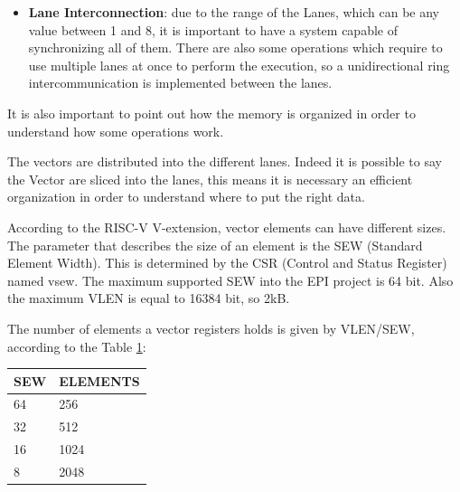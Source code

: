 \begin{itemize}
    This solution implies the existence of some cost in terms of latency, due to the starting of a new instruction.
    Inside the Vector Lane are also important the WB (Write-Back Buffer) and the LB (Load Buffer). Those buffers store the data until the VRF line is complete.
    Then there is the SB (Store Buffer) which hold the data read from the  register file and then sends it to the MU. 
    Eventually when an instruction is completed the physical register are then freed. 
    
    The VPU can be configured with different numbers of lanes from 1 up to 8, the default value is 8.
    
    \item \textbf{Lane Interconnection}: due to the range of the Lanes, which can be any value between 1 and 8, it is important to have a system capable of synchronizing all of them. There are also some operations which require to use multiple lanes at once to perform the execution, so a unidirectional ring intercommunication is implemented between the lanes.
\end{itemize}

It is also important to point out how the memory is organized in order to understand how some operations work.

The vectors are distributed into the different lanes. Indeed it is possible to say the Vector are sliced into the lanes, this means it is necessary an efficient organization in order to understand where to put the right data.


According to the RISC-V V-extension, vector elements can have different sizes. The parameter that describes the size of an element is the SEW (Standard Element Width). This is determined by the CSR (Control and Status Register) named vsew. The maximum supported SEW into the EPI project is 64 bit. Also the maximum VLEN is equal to 16384 bit, so 2kB.

The number of elements a vector registers holds is given by VLEN/SEW, according to the Table \ref{sew-el}:


\begin{table}[H]
    \centering
    \begin{tabular}{|l|l|}
    \hline
        \rowcolor[HTML]{C0C0C0} 
        SEW & ELEMENTS \\ \hline
        64  & 256      \\ \hline
        32  & 512      \\ \hline
        16  & 1024     \\ \hline
        8   & 2048     \\ \hline
    \end{tabular}
    \label{sew-el}
\end{table}

